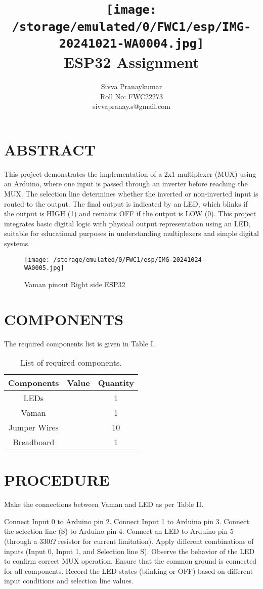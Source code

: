 \documentclass[conference]{IEEEtran}
\title{
\vspace{1cm}
{\texttt{[image: /storage/emulated/0/FWC1/esp/IMG-20241021-WA0004.jpg]} \\ ESP32 Assignment} }
\author{Sivva Pranaykumar \\ Roll No: FWC22273\\ sivvapranay.s@gmail.com}
\begin{document}
\maketitle
 \section {ABSTRACT}
This project demonstrates the implementation of a 2x1 multiplexer (MUX) using an Arduino, where one input is passed through an inverter before reaching the MUX. The selection line determines whether the inverted or non-inverted input is routed to the output. The final output is indicated by an LED, which blinks if the output is HIGH (1) and remains OFF if the output is LOW (0). This project integrates basic digital logic with physical output representation using an LED, suitable for educational purposes in understanding multiplexers and simple digital systems.
 
 \begin{figure}[h]
 \centering
 \texttt{[image: /storage/emulated/0/FWC1/esp/IMG-20241024-WA0005.jpg]}
 \caption{\label{fig:Gates} Vaman pinout Right side ESP32}
 \end{figure}
 
\section{COMPONENTS}
The required components list is given in Table I.

 \begin{table} [htbp]
\centering
\begin{tabular}{| c | c | c |} \hline
Components & Value & Quantity \\\hline
LEDs &  & 1 \\ \hline
Vaman &  & 1 \\ \hline
Jumper Wires &  & 10 \\ \hline
Breadboard & & 1 \\ 
\hline
\end{tabular}
\vspace{0.1cm}
\caption{\label{tab:components} List of required components.}
\end{table}

\section{PROCEDURE}
Make the connections between Vaman and LED as per Table II.

Connect Input 0 to Arduino pin 2.  
Connect Input 1 to Arduino pin 3.  
Connect the selection line (S) to Arduino pin 4.  
Connect an LED to Arduino pin 5 (through a 330\(\Omega\) resistor for current limitation).  
Apply different combinations of inputs (Input 0, Input 1, and Selection line S).  
Observe the behavior of the LED to confirm correct MUX operation.  
Ensure that the common ground is connected for all components.  
Record the LED states (blinking or OFF) based on different input conditions and selection line values.
\end{document}
